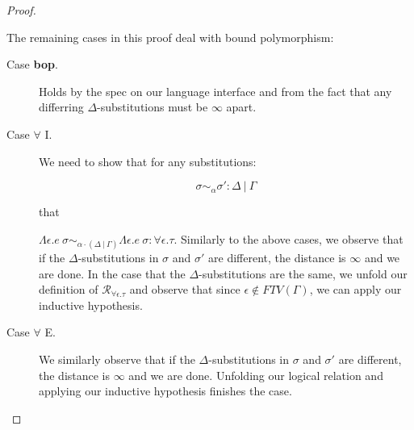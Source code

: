 \begin{proof}
\begin{description}
\begin{description}
    \end{description}

  \end{description}
  The remaining cases in this proof deal with bound polymorphism:
  \begin{description}
    \item[Case \textbf{bop}.] Holds by the spec on our language interface and
      from the fact that any differring $\Delta$-substitutions must be $\infty$
      apart.

    \item[Case $\forall$ I.] We need to show that for any substitutions:

      $$\sigma \sim_{\alpha} \sigma' : \Delta \ | \ \Gamma$$

      that 

      $\Lambda \epsilon . e~\sigma \sim_{\alpha \cdot (\Delta \ | \ \Gamma)}
      \Lambda \epsilon . e~\sigma : \forall \epsilon . \tau$. Similarly to the
      above cases, we observe that if the $\Delta$-substitutions in $\sigma$ and
      $\sigma'$ are different, the distance is $\infty$ and we are done. In the
      case that the $\Delta$-substitutions are the same, we unfold our
      definition of $\mathcal{R}_{\forall \epsilon . \tau}$ and observe that
      since $\epsilon \not\in FTV(\Gamma)$, we can apply our inductive
      hypothesis.

    \item[Case $\forall$ E.] We similarly observe that if the
      $\Delta$-substitutions in $\sigma$ and $\sigma'$ are different, the
      distance is $\infty$ and we are done. Unfolding our logical relation and
      applying our inductive hypothesis finishes the case.
  \end{description}
\end{proof}

%
